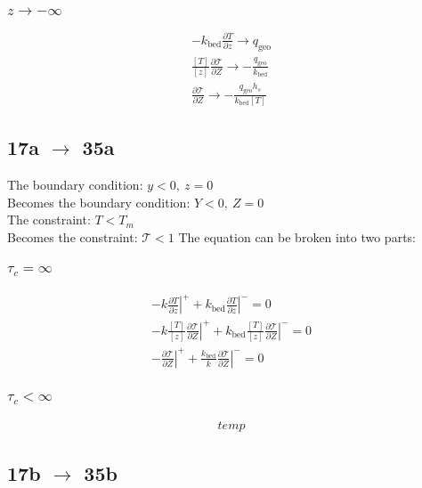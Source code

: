 \documentclass[10pt, letterpaper, twoside]{article}
\newcommand{\pd}[2]{\frac{\partial#1}{\partial#2}}
\begin{document}
	\subsubsection{$ z\rightarrow-\infty $}
	\begin{gather*}
		-k_{\text{bed}}\pd{T}{z}\rightarrow q_{\text{geo}} \tag{16b} \\
		\frac{\left[T\right]}{\left[z\right]}\pd{\mathcal{T}}{Z}\rightarrow-\frac{q_{\text{geo}}}{k_{\text{bed}}}\\
		\pd{\mathcal{T}}{Z}\rightarrow -\frac{q_{\text{geo}}h_s}{k_{\text{bed}}\left[T\right]} \tag{16b'}
	\end{gather*}
	\subsection{17a $ \rightarrow $ 35a}
	The boundary condition: $ y<0,\ z=0 $\\
	Becomes the boundary condition: $ Y<0,\ Z=0 $\\
	The constraint: $ T<T_m $\\
	Becomes the constraint: $ \mathcal{T}<1 $
	The equation can be broken into two parts:
	\subsubsection{$ \tau_c = \infty $}
	\begin{gather*}
		-k\left.\pd{T}{z}\right|^+ + k_{\text{bed}}\left.\pd{T}{z}\right|^- = 0 \tag{17a,I} \\
		-k\frac{\left[T\right]}{\left[z\right]}\left.\pd{\mathcal{T}}{Z}\right|^+ + k_{\text{bed}}\frac{\left[T\right]}{\left[z\right]}\left.\pd{\mathcal{T}}{Z}\right|^- = 0\\
		-\left.\pd{\mathcal{T}}{Z}\right|^+ + \frac{k_{\text{bed}}}{k}\left.\pd{\mathcal{T}}{Z}\right|^- = 0 \tag{17a',I}
	\end{gather*}
	\subsubsection{$ \tau_c < \infty $}
	\begin{gather*}
		temp
	\end{gather*}
	\subsection{17b $ \rightarrow $ 35b}
	
\end{document}
